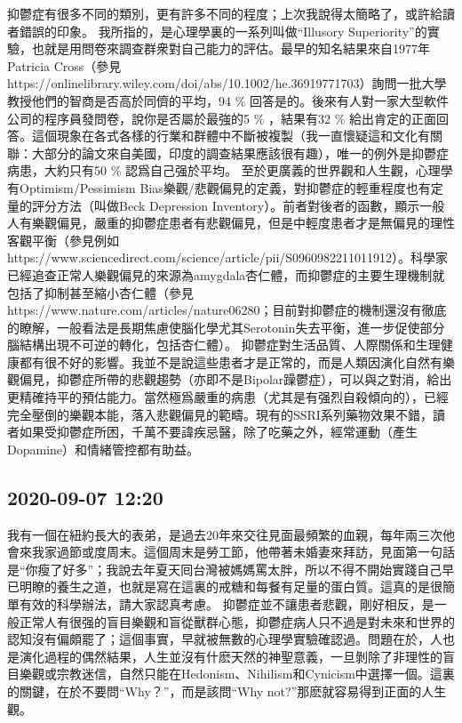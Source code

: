 \documentclass[twocolumn]{ctexart}
\begin{document}
抑鬱症有很多不同的類別，更有許多不同的程度；上次我說得太簡略了，或許給讀者錯誤的印象。
我所指的，是心理學裏的一系列叫做“Illusory Superiority”的實驗，也就是用問卷來調查群衆對自己能力的評估。最早的知名結果來自1977年Patricia Cross（參見https://onlinelibrary.wiley.com/doi/abs/10.1002/he.36919771703）詢問一批大學教授他們的智商是否高於同儕的平均，94 \% 回答是的。後來有人對一家大型軟件公司的程序員發問卷，說你是否屬於最強的5 \% ，結果有32 \% 給出肯定的正面回答。這個現象在各式各樣的行業和群體中不斷被複製（我一直懷疑這和文化有關聯：大部分的論文來自美國，印度的調查結果應該很有趣），唯一的例外是抑鬱症病患，大約只有50 \% 認爲自己强於平均。
至於更廣義的世界觀和人生觀，心理學有Optimism/Pessimism Bias樂觀/悲觀偏見的定義，對抑鬱症的輕重程度也有定量的評分方法（叫做Beck Depression Inventory）。前者對後者的函數，顯示一般人有樂觀偏見，嚴重的抑鬱症患者有悲觀偏見，但是中輕度患者才是無偏見的理性客觀平衡（參見例如https://www.sciencedirect.com/science/article/pii/S0960982211011912）。科學家已經追查正常人樂觀偏見的來源為amygdala杏仁體，而抑鬱症的主要生理機制就包括了抑制甚至縮小杏仁體（參見https://www.nature.com/articles/nature06280；目前對抑鬱症的機制還沒有徹底的瞭解，一般看法是長期焦慮使腦化學尤其Serotonin失去平衡，進一步促使部分腦結構出現不可逆的轉化，包括杏仁體）。
抑鬱症對生活品質、人際關係和生理健康都有很不好的影響。我並不是說這些患者才是正常的，而是人類因演化自然有樂觀偏見，抑鬱症所帶的悲觀趨勢（亦即不是Bipolar躁鬱症），可以與之對消，給出更精確持平的預估能力。當然極爲嚴重的病患（尤其是有强烈自殺傾向的），已經完全壓倒的樂觀本能，落入悲觀偏見的範疇。現有的SSRI系列藥物效果不錯，讀者如果受抑鬱症所困，千萬不要諱疾忌醫，除了吃藥之外，經常運動（產生Dopamine）和情緒管控都有助益。
\subsection*{2020-09-07 12:20}

我有一個在紐約長大的表弟，是過去20年來交往見面最頻繁的血親，每年兩三次他會來我家過節或度周末。這個周末是勞工節，他帶著未婚妻來拜訪，見面第一句話是“你瘦了好多”；我說去年夏天囘台灣被媽媽罵太胖，所以不得不開始實踐自己早已明瞭的養生之道，也就是寫在這裏的戒糖和每餐有足量的蛋白質。這真的是很簡單有效的科學辦法，請大家認真考慮。
抑鬱症並不讓患者悲觀，剛好相反，是一般正常人有很强的盲目樂觀和盲從獸群心態，抑鬱症病人只不過是對未來和世界的認知沒有偏頗罷了；這個事實，早就被無數的心理學實驗確認過。問題在於，人也是演化過程的偶然結果，人生並沒有什麽天然的神聖意義，一旦剝除了非理性的盲目樂觀或宗教迷信，自然只能在Hedonism、Nihilism和Cynicism中選擇一個。這裏的關鍵，在於不要問“Why？”，而是該問“Why not?”那麽就容易得到正面的人生觀。
\end{document}
